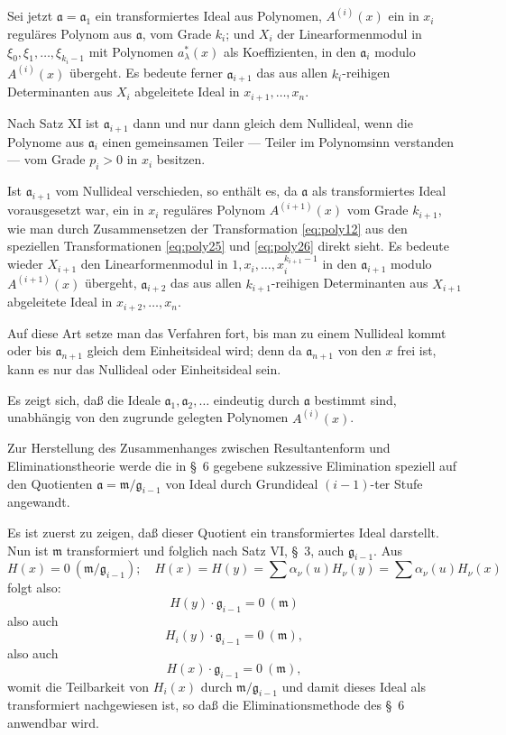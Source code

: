 \documentclass[fontsize=10pt,paper=a5,pagesize,headings=small]{scrbook}
\newcommand{\ideal}[1]{\mathfrak{#1}}
\theoremstyle{plain}
\begin{document}
Sei jetzt $\ideal{a} = \ideal{a}_1$ ein transformiertes Ideal aus Polynomen, $A^{(i)}(x)$ ein in $x_i$
reguläres Polynom aus $\ideal{a}$, vom Grade $k_i$; und $X_i$ der Linearformenmodul in
$\xi_0,\xi_1,\dots,\xi_{k_i-1}$ mit Polynomen $a_\lambda^*(x)$ als Koeffizienten, in den $\ideal{a}_i$ modulo
$A^{(i)}(x)$ übergeht. Es bedeute ferner $\ideal{a}_{i+1}$ das aus allen $k_i$-reihigen Determinanten
aus $X_i$ abgeleitete Ideal in $x_{i+1},\dots,x_n$.

\newpage
\setcounter{page}{446}

Nach Satz XI ist $\ideal{a}_{i+1}$ dann und nur dann gleich dem Nullideal, wenn die Polynome
aus $\ideal{a}_i$ einen gemeinsamen Teiler --- Teiler im Polynomsinn verstanden --- vom Grade
$p_i > 0$ in $x_i$ besitzen.

Ist $\ideal{a}_{i+1}$ vom Nullideal verschieden, so enthält es, da $\ideal{a}$ als transformiertes Ideal
vorausgesetzt war, ein in $x_i$ reguläres Polynom $A^{(i+1)}(x)$ vom Grade $k_{i+1}$, wie man
durch Zusammensetzen der Transformation \eqref{eq:poly12} aus den speziellen Transformationen
\eqref{eq:poly25} und \eqref{eq:poly26} direkt sieht. Es bedeute wieder $X_{i+1}$ den Linearformenmodul in
$1, x_i,\dots, x_i^{k_{i+1}-1}$ in den $\ideal{a}_{i+1}$ modulo $A^{(i+1)}(x)$ übergeht, $\ideal{a}_{i+2}$ das aus allen
$k_{i+1}$-reihigen Determinanten aus $X_{i+1}$ abgeleitete Ideal in $x_{i+2},\dots,x_n$.

Auf diese Art setze man das Verfahren fort, bis man zu einem Nullideal kommt
oder bis $\ideal{a}_{n+1}$ gleich dem Einheitsideal wird; denn da $\ideal{a}_{n+1}$ von den $x$ frei ist, kann
es nur das Nullideal oder Einheitsideal sein.

Es zeigt sich, daß die Ideale $\ideal{a}_1, \ideal{a}_2,\dots$ eindeutig durch $\ideal{a}$ bestimmt sind,
unabhängig von den zugrunde gelegten Polynomen $A^{(i)}(x)$.

\newpage
\setcounter{page}{447}

Zur Herstellung des Zusammenhanges zwischen Resultantenform und Eliminations\-theorie
werde die in \S~6 gegebene sukzessive Elimination speziell auf den Quotienten
$\ideal{a} = \ideal{m}/\ideal{g}_{i-1}$ von Ideal durch Grundideal $(i-1)$-ter Stufe angewandt.

Es ist zuerst zu zeigen, daß dieser Quotient ein transformiertes Ideal darstellt.
Nun ist $\ideal{m}$ transformiert und folglich nach Satz VI, \S~3, auch $\ideal{g}_{i-1}$. Aus
\[ H(x) = 0\ (\ideal{m}/\ideal{g}_{i-1});\quad H(x) = H(y) = \sum \alpha_\nu(u) H_\nu(y) = \sum \alpha_\nu(u) H_\nu(x) \]
folgt also:
\[ H(y) \cdot \ideal{g}_{i-1} = 0\ (\ideal{m}) \]
also auch
\[ H_i(y) \cdot \ideal{g}_{i-1} = 0\ (\ideal{m}), \]
also auch
\[ H(x) \cdot \ideal{g}_{i-1} = 0\ (\ideal{m}), \]
womit die Teilbarkeit von $H_i(x)$ durch $\ideal{m}/\ideal{g}_{i-1}$ und damit dieses Ideal als
transformiert nachgewiesen ist, so daß die Eliminationsmethode des \S~6 anwendbar
wird.
\end{document}
